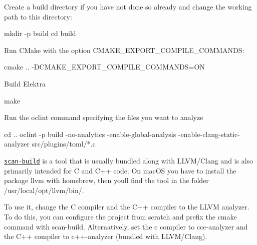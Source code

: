 \begin{DoxyEnumerate}
\item Create a build directory if you have not done so already and change the working path to this directory\+:
\end{DoxyEnumerate}


\begin{DoxyCode}
mkdir -p build
cd build
\end{DoxyCode}



\begin{DoxyEnumerate}
\item Run C\+Make with the option {\ttfamily C\+M\+A\+K\+E\+\_\+\+E\+X\+P\+O\+R\+T\+\_\+\+C\+O\+M\+P\+I\+L\+E\+\_\+\+C\+O\+M\+M\+A\+N\+DS}\+:
\end{DoxyEnumerate}


\begin{DoxyCode}
cmake .. -DCMAKE\_EXPORT\_COMPILE\_COMMANDS=ON
\end{DoxyCode}



\begin{DoxyEnumerate}
\item Build Elektra
\end{DoxyEnumerate}


\begin{DoxyCode}
make
\end{DoxyCode}



\begin{DoxyEnumerate}
\item Run the {\ttfamily oclint} command specifying the files you want to analyze
\end{DoxyEnumerate}


\begin{DoxyCode}
cd ..
oclint -p build -no-analytics -enable-global-analysis -enable-clang-static-analyzer src/plugins/toml/*.c
\end{DoxyCode}


\href{http://clang-analyzer.llvm.org/scan-build.html}{\tt scan-\/build} is a tool that is usually bundled along with L\+L\+V\+M/\+Clang and is also primarily intended for C and C++ code. On mac\+OS you have to install the package {\ttfamily llvm} with homebrew, then you\textquotesingle{}ll find the tool in the folder {\ttfamily /usr/local/opt/llvm/bin/}.

To use it, change the C compiler and the C++ compiler to the L\+L\+VM analyzer. To do this, you can configure the project from scratch and prefix the cmake command with {\ttfamily scan-\/build}. Alternatively, set the c compiler to {\ttfamily ccc-\/analyzer} and the C++ compiler to {\ttfamily c++-\/analyzer} (bundled with L\+L\+V\+M/\+Clang).

